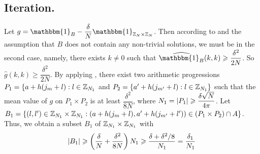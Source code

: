 \subsection{Iteration.}
Let $ g = \mathbbm{1}_B - \dfrac{\delta}{N} \mathbbm{1}_{\bbZ_N \times \bbZ_N} $. Then according to  and the assumption that $ B $ does not contain any non-trivial solutions, we must be in the second case, namely, there exists $ k \neq 0 $ such that $ \widehat{\mathbbm{1}_B}(k,k) \geq \dfrac{\delta^2}{2N} $. So $ \widehat{g}(k, k) \geq \dfrac{\delta^2}{2N} $. By applying , there exist two arithmetic progressions $ P_1  = \{ a + h(j_m + l): l \in {\mathbb Z}_{N_1} $ and $ P_2  = \{ a' + h(j_{m'} + l): l \in  {\mathbb Z}_{N_1} \} $ such that the mean value of $ g $ on $ P_1 \times P_2 $ is at least $ \dfrac{\delta^2}{8N} $, where $ N_1 = \left\vert{P_1}\right\vert \geqslant \dfrac{\delta \sqrt{N}}{4 \pi} $. Let $ B_1 = \{ (l, l') \in {\mathbb Z}_{N_1} \times {\mathbb Z}_{N_1}: (a + h(j_m + l), a' + h(j_{m'} + l')) \in (P_1 \times P_2) \cap A \} $. Thus, we obtain a subset $ B_1 $ of $ {\mathbb Z}_{N_1} \times {\mathbb Z}_{N_1} $ with 
$$ \left\vert{B_1}\right\vert \geqslant \left(\dfrac{\delta}{N} + \dfrac{\delta^2}{8N}\right) N_1 \geqslant \dfrac{\delta + \delta^2/8} {N_1} = \dfrac{\delta_1}{N_1} $$

